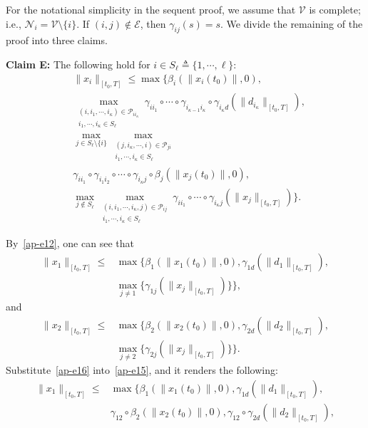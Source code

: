 \documentclass[journal]{IEEEtran}
\newcommand{\nnum}{\nonumber}
\newcommand{\EE}{{\mathcal{E}}}
\newcommand{\NN}{{\mathcal{N}}}
\newcommand{\VV}{{\mathcal{V}}}
\begin{document}
\begin{IEEEproof} For the notational simplicity in the sequent proof, we assume that ${\VV}$ is complete; i.e., ${{\NN}}_i = {\VV}\setminus\{i\}$. If $(i,j)\notin \EE$, then $\gamma_{ij}(s) = s$. We divide the remaining of the proof into three claims.

\textbf{Claim E:} The following hold for $i\in S_{\ell}\triangleq \{1,\cdots,\ell\}$: \begin{align}&\|x_i\|_{[t_0,T]}\leq \max\{\beta_i(\|x_i(t_0)\|,0),\nnum\\
&\max_{\substack{(i,i_1,\cdots,i_\kappa)\in\mathcal{P}_{i i_\kappa}\\
i_1,\cdots,i_\kappa\in S_{\ell}}}\gamma_{ii_1}\circ\cdots
\circ\gamma_{i_{\kappa-1}i_{\kappa}}\circ\gamma_{i_{\kappa}d}
(\|d_{i_{\kappa}}\|_{[t_0,T]}),\nnum\\
&\max_{j\in S_{\ell}\setminus\{i\}}\max_{\substack{(j,i_\kappa,\cdots,i)\in\mathcal{P}_{ji}\\
i_1,\cdots,i_{\kappa}\in S_{\ell}}}\nnum\\
&\gamma_{ii_1}\circ\gamma_{i_1i_2}\circ\cdots\circ\gamma_{i_\kappa j}\circ
\beta_j(\|x_j(t_0)\|,0),\nnum\\
&\max_{j\notin S_{\ell}}\max_{\substack{(i,i_1,\cdots,i_\kappa,j)\in\mathcal{P}_{ij}\\
i_1,\cdots,i_\kappa\in S_{\ell}}}\gamma_{ii_1}\circ\cdots\circ\gamma_{i_{\kappa}j}(\|x_j\|_{[t_0,T]})\}.
\label{ap-e14}\end{align}
\begin{IEEEproof} By~\eqref{ap-e12}, one can see that
\begin{align}\|x_1\|_{[t_0,T]}\leq &\max\{\beta_1(\|x_1(t_0)\|,0),\gamma_{1d}(\|d_1\|_{[t_0,T]}),\nnum\\
&\max_{j\neq 1}\{\gamma_{1j}(\|x_j\|_{[t_0,T]})\}\},\label{ap-e15}\end{align}
and \begin{align}\|x_2\|_{[t_0,T]}\leq &\max\{\beta_2(\|x_2(t_0)\|,0),\gamma_{2d}(\|d_2\|_{[t_0,T]}),\nnum\\
&\max_{j\neq 2}\{\gamma_{2j}(\|x_j\|_{[t_0,T]})\}\}.\label{ap-e16}\end{align}
Substitute~\eqref{ap-e16} into~\eqref{ap-e15}, and it renders the following:
\begin{align}\|x_1\|_{[t_0,T]}\leq &\max\{\beta_1(\|x_1(t_0)\|,0),\gamma_{1d}(\|d_1\|_{[t_0,T]}),\nnum\\
&\gamma_{12}\circ\beta_2(\|x_2(t_0)\|,0),\gamma_{12}
\circ\gamma_{2d}(\|d_2\|_{[t_0,T]}),\nnum\\

\end{align}
\end{IEEEproof}
\end{IEEEproof}
\end{document}
